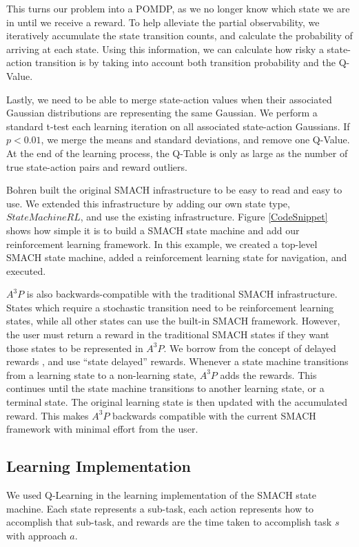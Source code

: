 \documentclass[letterpaper, 10 pt, conference]{ieeeconf}  %
\begin{document}
This turns our problem into a POMDP, as we no longer know which state we are in until we receive a reward. To help alleviate the partial observability, we iteratively accumulate the state transition counts, and calculate the probability of arriving at each state. Using this information, we can calculate how risky a state-action transition is by taking into account both transition probability and the Q-Value. 

Lastly, we need to be able to merge state-action values when their associated Gaussian distributions are representing the same Gaussian. We perform a standard t-test each learning iteration on all associated state-action Gaussians. If $p < 0.01$, we merge the means and standard deviations, and remove one Q-Value. At the end of the learning process, the Q-Table is only as large as the number of true state-action pairs and reward outliers. 

Bohren \cite{smach} built the original SMACH infrastructure to be easy to read and easy to use. We extended this infrastructure by adding our own state type, $StateMachineRL$, and use the existing infrastructure. Figure \ref{CodeSnippet} shows how simple it is to build a SMACH state machine and add our reinforcement learning framework. In this example, we created a top-level SMACH state machine, added a reinforcement learning state for navigation, and executed. 

$A^3P$ is also backwards-compatible with the traditional SMACH infrastructure. States which require a stochastic transition need to be reinforcement learning states, while all other states can use the built-in SMACH framework. However, the user must return a reward in the traditional SMACH states if they want those states to be represented in $A^3P$. We borrow from the concept of delayed rewards \cite{journals/nn/StringerRT07, Watkins:1989}, and use ``state delayed'' rewards. Whenever a state machine transitions from a learning state to a non-learning state, $A^3P$ adds the rewards. This continues until the state machine transitions to another learning state, or a terminal state. The original learning state is then updated with the accumulated reward. This makes $A^3P$ backwards compatible with the current SMACH framework with minimal effort from the user.

\subsection{Learning Implementation}

We used Q-Learning in the learning implementation of the SMACH state machine. Each state represents a sub-task, each action represents how to accomplish that sub-task, and rewards are the time taken to accomplish task $s$ with approach $a$.
\end{document}
